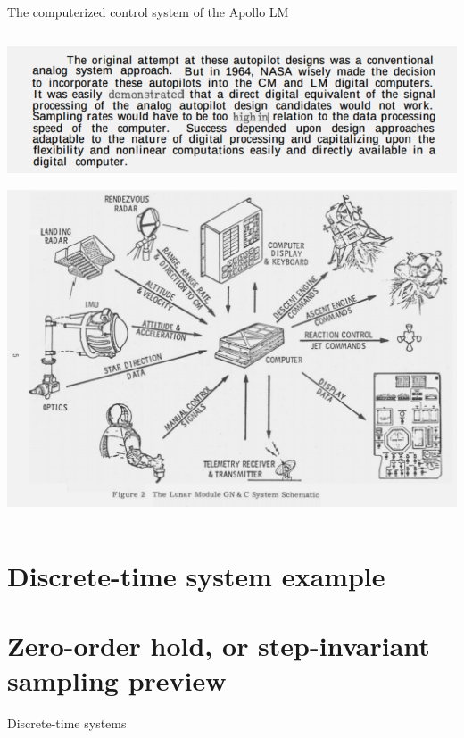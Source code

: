 \documentclass[presentation,aspectratio=169]{beamer}
\begin{document}
\begin{frame}[label={sec:org6974285}]{The computerized control system of the Apollo LM}
\begin{columns}
\begin{column}{0.7\columnwidth}
\begin{center}
 \includegraphics[width=.7\linewidth]{../../figures/Hoag-report-2.png}
\end{center}

\pause

\begin{center}
 \includegraphics[width=.7\linewidth]{../../figures/Hoag-report-fig2.png}
\end{center}
\end{column}
\end{columns}
\end{frame}

\section{Discrete-time system example}
\label{sec:org7d51b9e}

\section{Zero-order hold, or step-invariant sampling preview}
\label{sec:org17d5437}

\begin{frame}[label={sec:org992311c}]{Discrete-time systems}
\end{frame}
\end{document}
